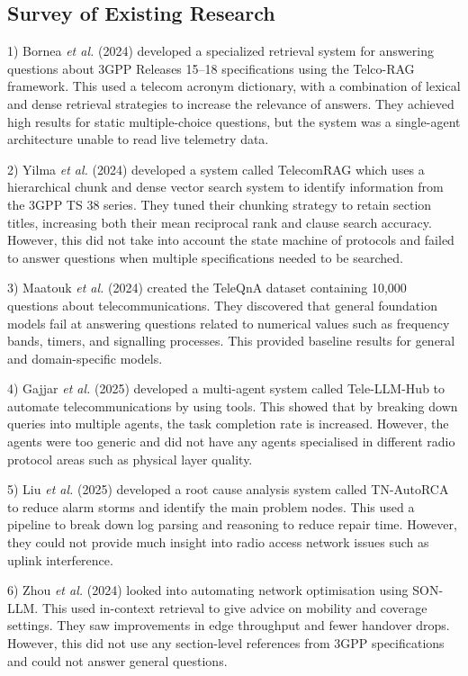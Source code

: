 \documentclass[conference]{IEEEtran}
\begin{document}
\subsection{Survey of Existing Research}
1) Bornea \textit{et al.} (2024) \cite{bornea2024} developed a specialized retrieval system for answering questions about 3GPP Releases 15--18 specifications using the Telco-RAG framework. This used a telecom acronym dictionary, with a combination of lexical and dense retrieval strategies to increase the relevance of answers. They achieved high results for static multiple-choice questions, but the system was a single-agent architecture unable to read live telemetry data.

2) Yilma \textit{et al.} (2024) \cite{yilma2024} developed a system called TelecomRAG which uses a hierarchical chunk and dense vector search system to identify information from the 3GPP TS 38 series. They tuned their chunking strategy to retain section titles, increasing both their mean reciprocal rank and clause search accuracy. However, this did not take into account the state machine of protocols and failed to answer questions when multiple specifications needed to be searched.

3) Maatouk \textit{et al.} (2024) \cite{maatouk2024} created the TeleQnA dataset containing 10,000 questions about telecommunications. They discovered that general foundation models fail at answering questions related to numerical values such as frequency bands, timers, and signalling processes. This provided baseline results for general and domain-specific models.

4) Gajjar \textit{et al.} (2025) \cite{gajjar2025} developed a multi-agent system called Tele-LLM-Hub to automate telecommunications by using tools. This showed that by breaking down queries into multiple agents, the task completion rate is increased. However, the agents were too generic and did not have any agents specialised in different radio protocol areas such as physical layer quality.

5) Liu \textit{et al.} (2025) \cite{liu2025} developed a root cause analysis system called TN-AutoRCA to reduce alarm storms and identify the main problem nodes. This used a pipeline to break down log parsing and reasoning to reduce repair time. However, they could not provide much insight into radio access network issues such as uplink interference.

6) Zhou \textit{et al.} (2024) \cite{zhou2024} looked into automating network optimisation using SON-LLM. This used in-context retrieval to give advice on mobility and coverage settings. They saw improvements in edge throughput and fewer handover drops. However, this did not use any section-level references from 3GPP specifications and could not answer general questions.
\end{document}
